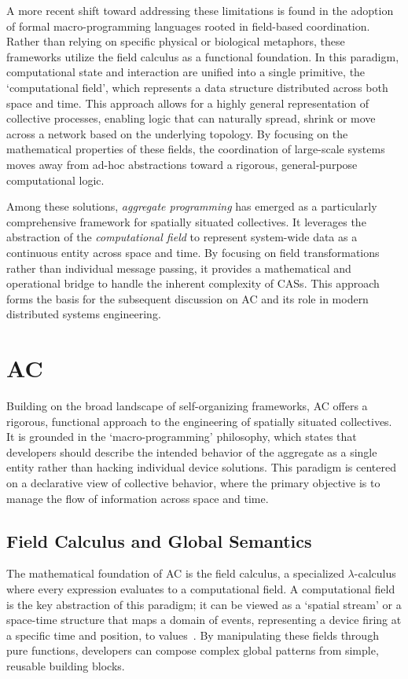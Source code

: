 A more recent shift toward addressing these limitations is found in the adoption of formal macro-programming languages rooted in field-based coordination. Rather than relying on specific physical or biological metaphors, these frameworks utilize the field calculus as a functional foundation. In this paradigm, computational state and interaction are unified into a single primitive, the `computational field', which represents a data structure distributed across both space and time. This approach allows for a highly general representation of collective processes, enabling logic that can naturally spread, shrink or move across a network based on the underlying topology. By focusing on the mathematical properties of these fields, the coordination of large-scale systems moves away from ad-hoc abstractions toward a rigorous, general-purpose computational logic.

Among these solutions, \emph{aggregate programming} has emerged as a particularly comprehensive framework for spatially situated collectives. It leverages the abstraction of the \emph{computational field} to represent system-wide data as a continuous entity across space and time. By focusing on field transformations rather than individual message passing, it provides a mathematical and operational bridge to handle the inherent complexity of \acp{CAS}. This approach forms the basis for the subsequent discussion on \ac{AC} and its role in modern distributed systems engineering.

\section{\acl{AC}}

Building on the broad landscape of self-organizing frameworks, \ac{AC} offers a rigorous, functional approach to the engineering of spatially situated collectives. It is grounded in the `macro-programming' philosophy, which states that developers should describe the intended behavior of the aggregate as a single entity rather than hacking individual device solutions. This paradigm is centered on a declarative view of collective behavior, where the primary objective is to manage the flow of information across space and time.

\subsection{Field Calculus and Global Semantics}

The mathematical foundation of \ac{AC} is the field calculus, a specialized $\lambda$-calculus \cite{DBLP:journals/tocl/AudritoVDPB19} where every expression evaluates to a computational field. A computational field is the key abstraction of this paradigm; it can be viewed as a `spatial stream' or a space-time structure that maps a domain of events, representing a device firing at a specific time and position, to values~\cite{DBLP:journals/jlap/ViroliBDACP19}. By manipulating these fields through pure functions, developers can compose complex global patterns from simple, reusable building blocks.

